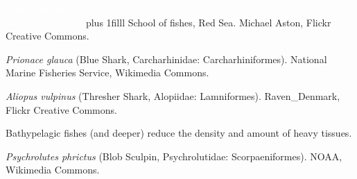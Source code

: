 \documentclass[t]{beamer}
\begin{document}

{
\begin{frame}[t,plain]

\vspace{3\baselineskip}
\hangpara\LARGE\hspace{9em}\textcolor{white}{How do fishes}\\%
	\LARGE\hspace{9em}\textcolor{white}{control buoyancy?}
\vskip0pt plus 1filll
\tiny\textcolor{white!80!black}{School of fishes, Red Sea. Michael Aston, Flickr Creative Commons.}
\end{frame}
}


{
\begin{frame}[b,plain]

\hfill\tiny\textcolor{white!80!black}{\textit{Prionace glauca} (Blue Shark, Carcharhinidae: Carcharhiniformes). National Marine Fisheries Service, Wikimedia Commons.}

\end{frame}
}


{
\begin{frame}[b,plain]

\tiny\textcolor{white!80!black}{\textit{Aliopus vulpinus} (Thresher Shark, Alopiidae: Lamniformes). Raven\_Denmark, Flickr Creative Commons.}

\end{frame}
}

{
\begin{frame}[b,plain]{Bathypelagic fishes (and deeper) reduce the density and amount of heavy tissues.}

\hfill\tiny\textcolor{white!20!black}{\textit{Psychrolutes phrictus} (Blob Sculpin, Psychrolutidae: Scorpaeniformes). NOAA, Wikimedia Commons.}

\end{frame}
}
\end{document}
